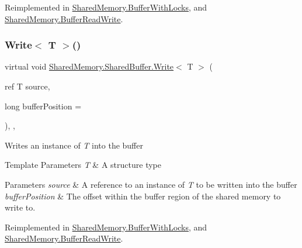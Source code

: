 Reimplemented in \hyperlink{class_shared_memory_1_1_buffer_with_locks_a80c23992356dd3b7613f34223cf6b1fb}{Shared\+Memory.\+Buffer\+With\+Locks}, and \hyperlink{class_shared_memory_1_1_buffer_read_write_aa4ee6183b43f3bb1728f3296967e586e}{Shared\+Memory.\+Buffer\+Read\+Write}.

\mbox{\label{class_shared_memory_1_1_shared_buffer_a82edbe6f30b012bc93f098db46a582ec}} 
\subsubsection{\texorpdfstring{Write$<$ T $>$()}{Write< T >()}\hspace{0.1cm}{\footnotesize\ttfamily [1/3]}}
{\footnotesize\ttfamily virtual void \hyperlink{class_shared_memory_1_1_shared_buffer_acbe85aa71eaf1624fa5e03c0b026fa52}{Shared\+Memory.\+Shared\+Buffer.\+Write}$<$ T $>$ (\begin{DoxyParamCaption}\item[{ref T}]{source,  }\item[{long}]{buffer\+Position = {} }\end{DoxyParamCaption})\hspace{0.3cm}{\ttfamily [inline]}, {\ttfamily [protected]}, {\ttfamily [virtual]}}



Writes an instance of {\itshape T}  into the buffer 


\begin{DoxyTemplParams}{Template Parameters}
{\em T} & A structure type\\
\hline
\end{DoxyTemplParams}

\begin{DoxyParams}{Parameters}
{\em source} & A reference to an instance of {\itshape T}  to be written into the buffer\\
\hline
{\em buffer\+Position} & The offset within the buffer region of the shared memory to write to.\\
\hline
\end{DoxyParams}


Reimplemented in \hyperlink{class_shared_memory_1_1_buffer_with_locks_a270a03b398be5cb2c9d3fca8be14129b}{Shared\+Memory.\+Buffer\+With\+Locks}, and \hyperlink{class_shared_memory_1_1_buffer_read_write_a277110184ecebdd2d6337c5d6b52f3fa}{Shared\+Memory.\+Buffer\+Read\+Write}.

